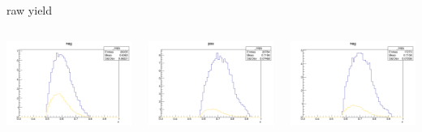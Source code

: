 \begin{frame}{raw yield}
\begin{columns}
\begin{column}[T]{0.25\textwidth}
\includegraphics[width = \textwidth]{results/yield/statistics/yield_x_Q2_z_0.55_4.764_0.60_neg.png}
\end{column}
\begin{column}[T]{0.25\textwidth}
\includegraphics[width = \textwidth]{results/yield/statistics/yield_x_Q2_z_0.55_4.764_0.70_pos.png}
\end{column}
\begin{column}[T]{0.25\textwidth}
\includegraphics[width = \textwidth]{results/yield/statistics/yield_x_Q2_z_0.55_4.764_0.70_neg.png}
\end{column}
\end{columns}
\end{frame}
